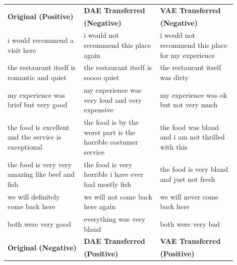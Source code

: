 \documentclass[11pt,a4paper]{article}
\begin{document}
\begin{table}[!ht]
	\centering
	\begin{tabular}{| p{0.3\linewidth} | p{0.3\linewidth} | p{0.3\linewidth} |}
		\hline
		\multirow{2}{*}{\textbf{Original (Positive)}}          & \textbf{DAE Transferred}                                       & \textbf{VAE Transferred}                                    \\
		                                                       & \textbf{(Negative)}                                            & \textbf{(Negative)}                                         \\
		\hline
		i would recommend a visit here                         & i would not recommend this place again                         & i would not recommend this place for my experience          \\
		\hline
		the restaurant itself is romantic and quiet            & the restaurant itself is soooo quiet                           & the restaurant itself was dirty                             \\
		\hline
		my experience was brief but very good                  & my experience was very loud and very expensive                 & my experience was ok but not very much                      \\
		\hline
		the food is excellent and the service is exceptional   & the food is by the worst part is the horrible costumer service & the food was bland and i am not thrilled with this          \\
		\hline
		the food is very very amazing like beef and fish       & the food is very horrible i have ever had mostly fish          & the food is very bland and just not fresh                   \\
		\hline
		we will definitely come back here                      & we will not come back here again                               & we will never come back here                                \\
		\hline
		both were very good                                    & everything was very bland                                      & both were very bad                                          \\
		\hline
		\hline
		\multirow{2}{*}{\textbf{Original (Negative)}}          & \textbf{DAE Transferred}                                       & \textbf{VAE Transferred}                                    \\
		                                                       & \textbf{(Positive)}                                            & \textbf{(Positive)}                                         \\

\end{tabular}
\end{table}
\end{document}
